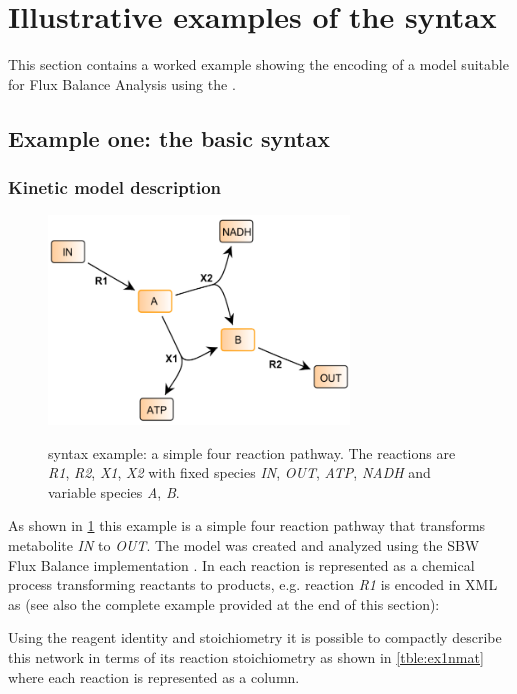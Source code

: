 
\section{Illustrative examples of the \FBC syntax}
\label{examples}

This section contains a worked example showing the encoding of a model suitable for Flux Balance Analysis using the \FBCPackage.

\subsection{Example one: the basic \FBC syntax}
\label{examples1}
\subsubsection{Kinetic model description}
\begin{figure}[h]
  \centering
  \includegraphics[width=8cm]{examples/spec-example1.pdf}\\
  \caption{\FBC syntax example: a simple four reaction pathway. The
  reactions are \textit{R1}, \textit{R2}, \textit{X1}, \textit{X2} with
  fixed species \textit{IN}, \textit{OUT}, \textit{ATP}, \textit{NADH} and
  variable species \textit{A}, \textit{B}.}
  \label{fig:example1}
\end{figure}

As shown in \ref{fig:example1} this example is a simple four reaction 
pathway that transforms metabolite \textit{IN} to \textit{OUT}. The 
model was created and analyzed using the \textsf{SBW Flux Balance} \FBC 
implementation \cite{sbwfba, sbw}. In \SBML each reaction is represented 
as a chemical process transforming reactants to products, e.g. reaction 
\textit{R1} is encoded in XML as (see also the complete example provided 
at the end of this section): 


%
%
Using the reagent identity and stoichiometry it is possible to compactly 
describe this network in terms of its reaction stoichiometry as shown in 
\ref{tble:ex1nmat} where each reaction is represented as a column. 

